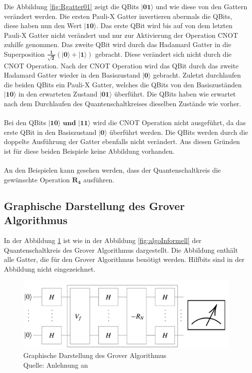 \noindent
Die Abbildung \ref{fig:Rgatter01} zeigt die QBits $\mathbf{|01\rangle}$  und wie diese von den Gattern verändert werden. Die ersten Pauli-X Gatter invertieren abermals die QBits, diese haben nun den Wert $\mathbf{|10\rangle}$. Das erste QBit wird bis auf von dem letzten Pauli-X Gatter nicht verändert und nur zur Aktivierung der Operation CNOT zuhilfe genommen. Das zweite QBit wird durch das Hadamard Gatter in die Superposition $\mathbf{\frac{1}{\sqrt 2}(|0\rangle + |1\rangle)}$ gebracht. Diese verändert sich nicht durch die CNOT Operation. Nach der CNOT Operation wird das QBit durch das zweite Hadamard Gatter wieder in den Basiszustand $\mathbf{|0\rangle}$ gebracht. Zuletzt durchlaufen die beiden QBits ein Pauli-X Gatter, welches die QBits von den Basiszuständen $\mathbf{|10\rangle}$ in den erwarteten Zustand $\mathbf{|01\rangle}$ überführt. Die QBits haben wie erwartet nach dem Durchlaufen des Quantenschaltkreises dieselben Zustände wie vorher.
\\ 
\\
Bei den QBits $\mathbf{|10\rangle \text{ und }|11\rangle}$ wird die CNOT Operation nicht ausgeführt, da das erste QBit in den Basiszustand $\mathbf{|0\rangle}$ überführt werden. Die QBits werden durch die doppelte Ausführung der Gatter ebenfalls nicht verändert. Aus diesen Gründen ist für diese beiden Beispiele keine Abbildung vorhanden.
\\
\\
An den Beispielen kann gesehen werden, dass der Quantenschaltkreis die gewünschte Operation $\mathbf{R_4}$ ausführen.

\subsection{Graphische Darstellung des Grover Algorithmus}
In der Abbildung \ref{fig:algoFormell} ist wie in der Abbildung \ref{fig:algoInformell} der Quantenschaltkreis des Grover Algorithmus dargestellt. Die Abbildung enthält alle Gatter, die für den Grover Algorithmus benötigt werden. Hilfbits sind in der Abbildung nicht eingezeichnet.

\begin{figure}[hbtp]
	\centering
	\includegraphics[width=1\textwidth]{figures/algoFormell.png}
	\caption{Graphische Darstellung des Grover Algorithmus \\ Quelle: Anlehnung an \cite[S. 146]{Homeister.2018} }
	\label{fig:algoFormell}
\end{figure}

